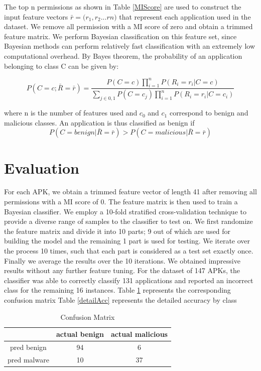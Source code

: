 The top n permissions as shown in Table \ref{MIScore} are used to construct the input feature vectors $\bar{r} = \big(r_{1}, r_{2}...r{n}\big)$ that represent each application used in the dataset. We remove all permission with a MI score of zero and obtain a trimmed feature matrix. We perform Bayesian classification on this feature set, since Bayesian methods can perform relatively fast classification with an extremely low computational overhead. By Bayes theorem, the probability of an application belonging to class C can be given by:

\begin{equation} \label{eqBayes}
P(C=c; \bar{R}=\bar{r}) = \frac{P(C=c)\prod_{i=1}^{n} P(R_{i}=r_{i}|C=c)}{\sum_{j\in {0,1}}P(C=c_{j})\prod_{i=1}^{n} {P(R_{i}=r_{i}|C=c_{i})}}
\end{equation}

where n is the number of features used and $c_{0}$ and $c_{1}$ correspond to benign and malicious classes. An application is thus classified as benign if $$P(C=benign|\bar{R}=\bar{r}) > P(C=malicious|\bar{R}=\bar{r})$$

\section{Evaluation}
For each APK, we obtain a trimmed feature vector of length 41 after removing all permissions with a MI score of 0. The feature matrix is then used to train a Bayesian classifier. We employ a 10-fold stratified cross-validation technique to provide a diverse range of samples to the classifier to test on. We first randomize the feature matrix and divide it into 10 parts; 9 out of which are used for building the model and the remaining 1 part is used for testing. We iterate over the process 10 times, such that each part is considered as a test set exactly once. Finally we average the results over the 10 iterations. We obtained impressive results without any further feature tuning. For the dataset of 147 APKs, the classifier was able to correctly classify 131 applications and reported an incorrect class for the remaining 16 instances. Table \ref{permConfMat} represents the corresponding confusion matrix Table \ref{detailAcc} represents the detailed accuracy by class

\begin{table}
  \centering%
  \begin{tabular}{|ccc|}
  \hline
 & actual benign & actual malicious \\ [0.5ex]
\hline 
pred benign & 94 & 6 \\
pred malware & 10 & 37 \\ 
\hline
  \end{tabular}
  \caption{Confusion Matrix}\label{permConfMat}
\end{table}

